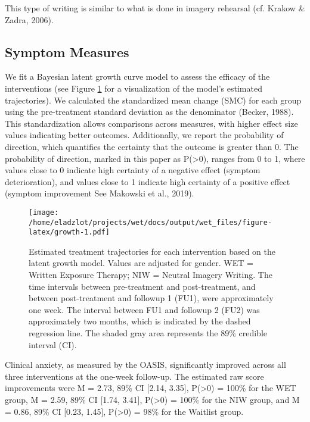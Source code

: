 \documentclass[
  man,floatsintext]{apa7}
\begin{document}
This type of writing is similar to what is done in imagery rehearsal (cf. Krakow \& Zadra, 2006).

\subsection{Symptom Measures}\label{symptom-measures}

We fit a Bayesian latent growth curve model to assess the efficacy of the interventions (see Figure \ref{fig:growth} for a visualization of the model's estimated trajectories).
We calculated the standardized mean change (SMC) for each group using the pre-treatment standard deviation as the denominator (Becker, 1988).
This standardization allows comparisons across measures, with higher effect size values indicating better outcomes.
Additionally, we report the probability of direction, which quantifies the certainty that the outcome is greater than 0.
The probability of direction, marked in this paper as P(\textgreater0), ranges from 0 to 1, where values close to 0 indicate high certainty of a negative effect (symptom deterioration), and values close to 1 indicate high certainty of a positive effect (symptom improvement See Makowski et al., 2019).



\begin{figure}
\centering
\texttt{[image: /home/eladzlot/projects/wet/docs/output/wet\_files/figure-latex/growth-1.pdf]}
\caption{\label{fig:growth}Estimated treatment trajectories for each intervention based on the latent growth model. Values are adjusted for gender. WET = Written Exposure Therapy; NIW = Neutral Imagery Writing. The time intervals between pre-treatment and post-treatment, and between post-treatment and followup 1 (FU1), were approximately one week. The interval between FU1 and followup 2 (FU2) was approximately two months, which is indicated by the dashed regression line. The shaded gray area represents the 89\% credible interval (CI).}
\end{figure}

Clinical anxiety, as measured by the OASIS, significantly improved across all three interventions at the one-week follow-up.
The estimated raw score improvements were M = 2.73, 89\% CI {[}2.14, 3.35{]}, P(\textgreater0) = 100\% for the WET group, M = 2.59, 89\% CI {[}1.74, 3.41{]}, P(\textgreater0) = 100\% for the NIW group, and M = 0.86, 89\% CI {[}0.23, 1.45{]}, P(\textgreater0) = 98\% for the Waitlist group.
\end{document}

